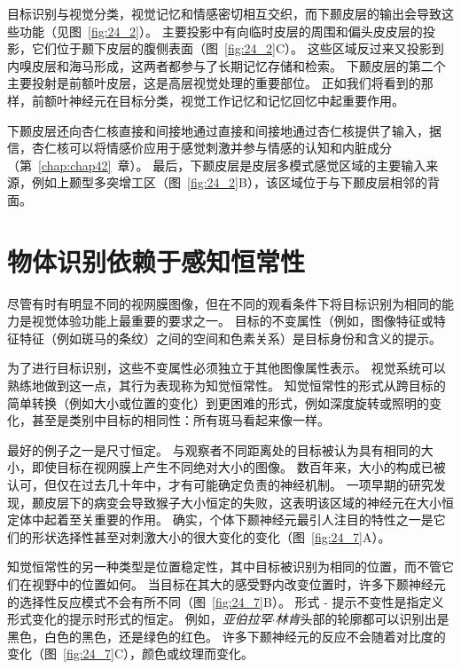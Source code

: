 目标识别与视觉分类，视觉记忆和情感密切相互交织，而下颞皮层的输出会导致这些功能（见图~\ref{fig:24_2}）。
主要投影中有向临时皮层的周围和偏头皮皮层的投影，它们位于颞下皮层的腹侧表面（图~\ref{fig:24_2}C）。
这些区域反过来又投影到内嗅皮层和海马形成，这两者都参与了长期记忆存储和检索。
下颞皮层的第二个主要投射是前额叶皮层，这是高层视觉处理的重要部位。
正如我们将看到的那样，前额叶神经元在目标分类，视觉工作记忆和记忆回忆中起重要作用。


下颞皮层还向杏仁核直接和间接地通过直接和间接地通过杏仁核提供了输入，据信，杏仁核可以将情感价应用于感觉刺激并参与情感的认知和内脏成分（第~\ref{chap:chap42}~章）。
最后，下颞皮层是皮层多模式感觉区域的主要输入来源，例如上颞型多突增工区（图~\ref{fig:24_2}B），该区域位于与下颞皮层相邻的背面。



\section{物体识别依赖于感知恒常性}

尽管有时有明显不同的视网膜图像，但在不同的观看条件下将目标识别为相同的能力是视觉体验功能上最重要的要求之一。
目标的不变属性（例如，图像特征或特征特征（例如斑马的条纹）之间的空间和色素关系）是目标身份和含义的提示。


为了进行目标识别，这些不变属性必须独立于其他图像属性表示。
视觉系统可以熟练地做到这一点，其行为表现称为知觉恒常性。
知觉恒常性的形式从跨目标的简单转换（例如大小或位置的变化）到更困难的形式，例如深度旋转或照明的变化，甚至是类别中目标的相同性：所有斑马看起来像一样。


最好的例子之一是尺寸恒定。
与观察者不同距离处的目标被认为具有相同的大小，即使目标在视网膜上产生不同绝对大小的图像。
数百年来，大小的构成已被认可，但仅在过去几十年中，才有可能确定负责的神经机制。
一项早期的研究发现，颞皮层下的病变会导致猴子大小恒定的失败，这表明该区域的神经元在大小恒定体中起着至关重要的作用。
确实，个体下颞神经元最引人注目的特性之一是它们的形状选择性甚至对刺激大小的很大变化的变化（图~\ref{fig:24_7}A）。


知觉恒常性的另一种类型是位置稳定性，其中目标被识别为相同的位置，而不管它们在视野中的位置如何。
当目标在其大的感受野内改变位置时，许多下颞神经元的选择性反应模式不会有所不同（图~\ref{fig:24_7}B）。
形式 - 提示不变性是指定义形式变化的提示时形式的恒定。
例如，\textit{亚伯拉罕$\cdot$林肯}头部的轮廓都可以识别出是黑色，白色的黑色，还是绿色的红色。 
许多下颞神经元的反应不会随着对比度的变化（图~\ref{fig:24_7}C），颜色或纹理而变化。


